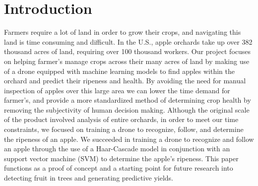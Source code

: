 \section{Introduction}
Farmers require a lot of land in order to grow their crops, and navigating this land is time consuming and difficult.
In the U.S., apple orchards take up over 382 thousand acres of land, requiring over 100 thousand workers\cite{USApple}. 
Our project focuses on helping farmer's manage crops across their many acres of land by making use of a drone equipped with machine learning models to 
find apples within the orchard and predict their ripeness and health. By avoiding the need for manual inspection of apples over this large area 
we can lower the time demand for farmer's, and provide a more standardized method of determining crop health by removing the subjectivity of human decision making.
Although the original scale of the product involved analysis of entire orchards, in order to meet our time constraints, we focused on training a drone to recognize, follow, and determine the ripeness of an apple. We succeeded in training a drone to recognize and follow an apple through the use of a Haar-Cascade model in conjunction with an support vector machine (SVM) to determine the apple's ripeness. This paper functions as a proof of concept and a starting point for future research into detecting fruit in trees and generating predictive yields.
\\
